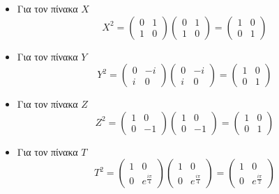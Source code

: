 \documentclass[12pt]{article}
\begin{document}
\begin{itemize}
    \item Για τον πίνακα $X$ $$X^2 =  \begin{pmatrix*}
        0 &1\\
        1 &0
    \end{pmatrix*} \begin{pmatrix*}
        0 &1\\
        1 &0
    \end{pmatrix*} =  \begin{pmatrix*}
        1 &0\\
        0 &1
    \end{pmatrix*}$$
    \item Για τον πίνακα $Y$ $$Y^2 =  \begin{pmatrix*}
        0 &-i\\
        i &0
    \end{pmatrix*} \begin{pmatrix*}
        0 &-i\\
        i &0
    \end{pmatrix*} =  \begin{pmatrix*}
        1 &0\\
        0 &1
    \end{pmatrix*}$$
    \item Για τον πίνακα $Z$ $$Z^2 =  \begin{pmatrix*}
        1 &0\\
        0 &-1
    \end{pmatrix*} \begin{pmatrix*}
        1 &0\\
        0 &-1
    \end{pmatrix*} =  \begin{pmatrix*}
        1 &0\\
        0 &1
    \end{pmatrix*}$$
    \item Για τον πίνακα $T$ $$T^2 =  \begin{pmatrix*}
        1 &0\\
        0 &e^{\frac{i\pi}{4}}
    \end{pmatrix*} \begin{pmatrix*}
        1 &0\\
        0 &e^{\frac{i\pi}{4}}
    \end{pmatrix*} =  \begin{pmatrix*}
        1 &0\\
        0 &e^{\frac{i\pi}{2}}
    \end{pmatrix*}$$

\end{itemize}
\end{document}

